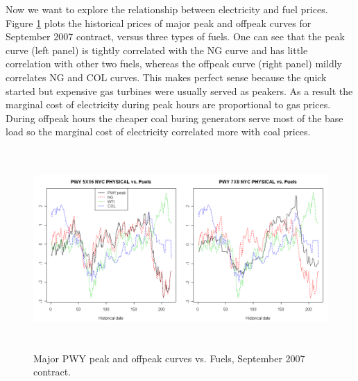 Now we want to explore the relationship between electricity 
and fuel prices. Figure \ref{pwy-fuel} plots the historical prices
of  major peak and offpeak curves for September 2007 contract, 
versus three types of fuels. One can see that the 
peak curve (left panel) is tightly correlated with the NG curve
and has little correlation with other two fuels, whereas
the offpeak curve (right panel) mildly correlates NG and 
COL curves. This makes perfect sense because  
the quick started but expensive gas turbines were usually served as peakers.
As a result the marginal cost of electricity during peak hours are 
proportional to gas prices. During offpeak hours the cheaper 
coal buring generators serve most of the base load so the
marginal cost of electricity correlated more with coal prices.
\begin{figure}[htbp]
\centering
\includegraphics[width=6in, height=3in]{figures/pwy-fuel.png}
\caption{Major PWY peak and offpeak curves vs. Fuels, September 2007 contract.}
\label{pwy-fuel}
\end{figure}

